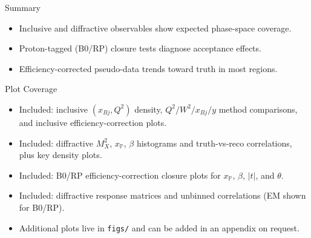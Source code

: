 \documentclass[aspectratio=169]{beamer}
\begin{document}

\begin{frame}{Summary}
  \begin{itemize}
    \item Inclusive and diffractive observables show expected phase-space coverage.
    \item Proton-tagged (B0/RP) closure tests diagnose acceptance effects.
    \item Efficiency-corrected pseudo-data trends toward truth in most regions.
  \end{itemize}
\end{frame}

\begin{frame}{Plot Coverage}
  \small
  \begin{itemize}
    \item Included: inclusive $(x_{Bj},Q^2)$ density, $Q^2/W^2/x_{Bj}/y$ method comparisons,
          and inclusive efficiency-correction plots.
    \item Included: diffractive $M_X^2$, $x_{\mathbb{P}}$, $\beta$ histograms and
          truth-vs-reco correlations, plus key density plots.
    \item Included: B0/RP efficiency-correction closure plots for $x_{\mathbb{P}}$, $\beta$, $|t|$, and $\theta$.
    \item Included: diffractive response matrices and unbinned correlations (EM shown for B0/RP).
    \item Additional plots live in \texttt{figs/} and can be added in an appendix on request.
  \end{itemize}
\end{frame}
\end{document}
